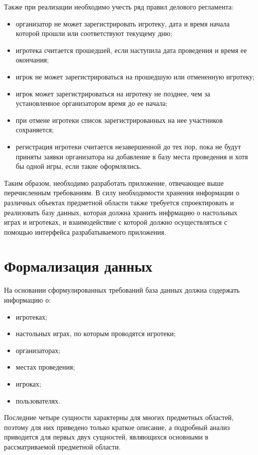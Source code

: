 Также при реализации необходимо учесть ряд правил делового регламента:
\begin{itemize}
    \item организатор не может зарегистрировать игротеку, дата и время начала
        которой прошли или соответствуют текущему дню;
    \item игротека считается прошедшей, если наступила дата проведения и время
        ее окончания;
    \item игрок не может зарегистрироваться на прошедшую или отмененную
        игротеку;
    \item игрок может зарегистрироваться на игротеку не позднее, чем за
        установленное организатором время до ее начала;
    \item при отмене игротеки список зарегистрированных на нее участников
        сохраняется;
    \item регистрация игротеки считается незавершенной до тех пор, пока не будут
        приняты заявки организатора на добавление в базу места проведения и хотя
        бы одной игры, если такие оформлялись.
\end{itemize}

Таким образом, необходимо разработать приложение, отвечающее выше перечисленным
требованиям. В силу необходимости хранения информации о различных объектах
предметной области также требуется спроектировать и реализовать базу данных,
которая должна хранить инфрмацию о настольных играх и игротеках, и
взаимодействие с которой должно осуществляться с помощью интерфейса
разрабатываемого приложения.

\section{\label{head:01}Формализация данных}

На основании сформулированных требований база данных должна содержать информацию
о:

\begin{itemize}
    \item игротеках;
    \item настольных играх, по которым проводятся игротеки;
    \item организаторах;
    \item местах проведения;
    \item игроках;
    \item пользователях.
\end{itemize}

Последние четыре сущности характерны для многих предметных областей, поэтому для
них приведено только краткое описание, а подробный анализ приводится для первых
двух сущностей, являющихся основными в рассматриваемой предметной области.

